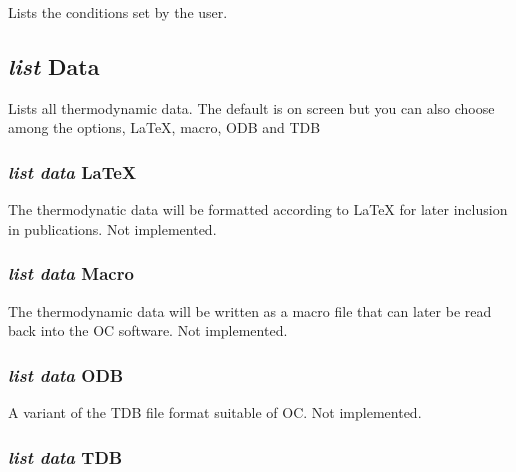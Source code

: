 \documentclass[12pt]{article}
\begin{document}
Lists the conditions set by the user.

\subsection{{\em list} Data}

Lists all thermodynamic data.  The default is on screen but you can also
choose among the options, LaTeX, macro, ODB and TDB

\subsubsection{{\em list data} LaTeX}

The thermodynatic data will be formatted according to LaTeX for later
inclusion in publications.  Not implemented.

\subsubsection{{\em list data} Macro}

The thermodynamic data will be written as a macro file that can later
be read back into the OC software.  Not implemented.

\subsubsection{{\em list data} ODB}

A variant of the TDB file format suitable of OC.  Not implemented.

\subsubsection{{\em list data} TDB}
\end{document}
